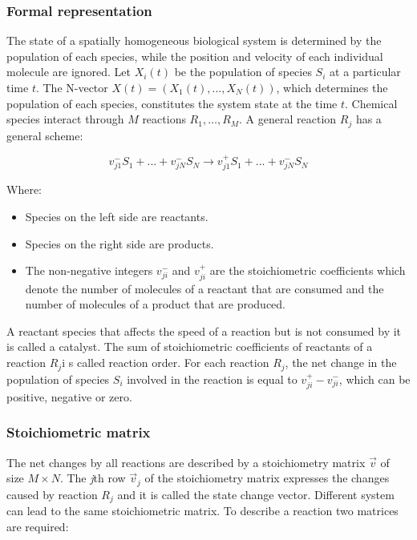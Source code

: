     \subsubsection{Formal representation}
    The state of a spatially homogeneous biological system is determined by the population of each species, while the position and velocity of each individual molecule are ignored.
    Let $X_i(t)$ be the population of species $S_i$ at a particular time $t$.
    The N-vector $X(t) = (X_1(t),...,X_N(t))$, which determines the population of each species, constitutes the system state at the time $t$.
    Chemical species interact through $M$ reactions $R_1, \dots, R_M$.
    A general reaction $R_j$ has a general scheme:

    $$v^-_{j1}S_1+...+v^-_{jN}S_N \rightarrow v^+_{j1}S_1+...+v^-_{jN}S_N$$

    Where:

    \begin{multicols}{2}
      \begin{itemize}
        \item Species on the left side are reactants.
        \item Species on the right side are products.
        \item The non-negative integers $v^-_{ji}$ and $v^+_{ji}$ are the stoichiometric coefficients which denote the number of molecules of a reactant that are consumed and the number of molecules of a product that are produced.
      \end{itemize}
    \end{multicols}

    A reactant species that affects the speed of a reaction but is not consumed by it is called a catalyst.
    The sum of stoichiometric coefficients of reactants of a reaction $R_j$i s called reaction order.
    For each reaction $R_j$, the net change in the population of species $S_i$ involved in the reaction is equal to $v^+_{ji}-v^-_{ji}$, which can be positive, negative or zero.

    \subsubsection{Stoichiometric matrix}
    The net changes by all reactions are described by a stoichiometry matrix $\vec{v}$ of size $M × N$.
    The \emph{j}th row $\vec{v}_j$ of the stoichiometry matrix expresses the changes caused by reaction $R_j$ and it is called the state change vector.
    Different system can lead to the same stoichiometric matrix.
    To describe a reaction two matrices are required:

